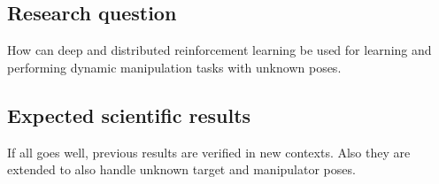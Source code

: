 \subsection{Research question}

How can deep and distributed reinforcement learning be used for learning and
performing dynamic manipulation tasks with unknown poses.

\subsection{Expected scientific results}

If all goes well, previous results are verified in new contexts. Also
they are extended to also handle unknown target and manipulator poses.
